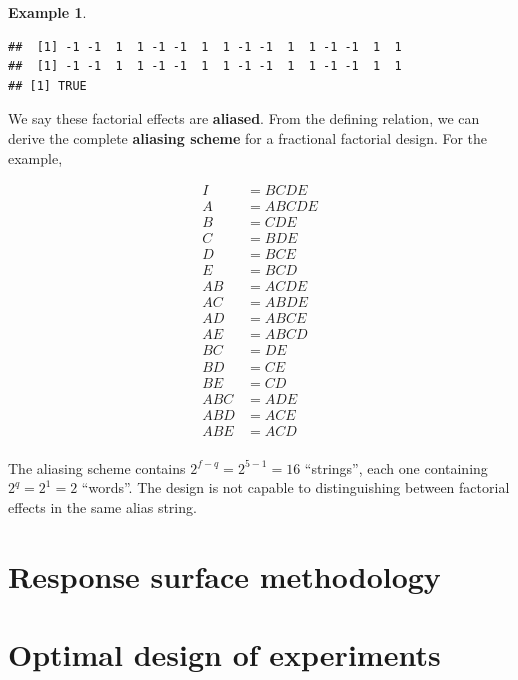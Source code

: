 \documentclass[
]{book}
\theoremstyle{definition}
\theoremstyle{definition}
\newtheorem{example}{Example}[chapter]
\theoremstyle{definition}
\theoremstyle{definition}
\theoremstyle{remark}
\begin{document}
\begin{example}
\begin{verbatim}
##  [1] -1 -1  1  1 -1 -1  1  1 -1 -1  1  1 -1 -1  1  1
##  [1] -1 -1  1  1 -1 -1  1  1 -1 -1  1  1 -1 -1  1  1
## [1] TRUE
\end{verbatim}

We say these factorial effects are \textbf{aliased}. From the defining relation, we can derive the complete \textbf{aliasing scheme} for a fractional factorial design. For the example,

\begin{align}
I & = BCDE \\
A & = ABCDE \\
B & = CDE \\
C & = BDE \\
D & = BCE \\
E & = BCD \\
AB & = ACDE \\
AC & = ABDE \\
AD & = ABCE \\
AE & = ABCD \\
BC & = DE \\
BD & = CE \\
BE & = CD \\
ABC & = ADE \\
ABD & = ACE \\
ABE & = ACD \\
\end{align}

The aliasing scheme contains \(2^{f-q} = 2^{5-1} = 16\) ``strings'', each one containing \(2^q = 2^1 = 2\) ``words''. The design is not capable to distinguishing between factorial effects in the same alias string.

\end{example}

\hypertarget{response-surface-methodology}{%
\chapter{Response surface methodology}\label{response-surface-methodology}}

\hypertarget{optimal-design-of-experiments}{%
\chapter{Optimal design of experiments}\label{optimal-design-of-experiments}}

  
\end{document}
